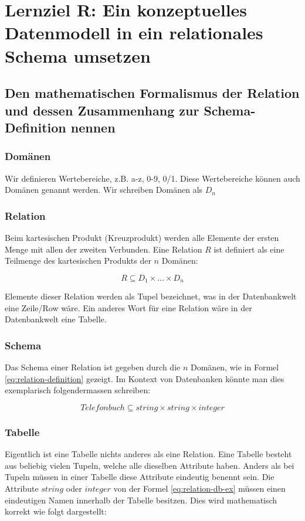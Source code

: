 \section{Lernziel R: Ein konzeptuelles Datenmodell in ein relationales Schema umsetzen}

\subsection{Den mathematischen Formalismus der Relation und dessen Zusammenhang zur Schema-Definition nennen}

\subsubsection{Domänen}
Wir definieren Wertebereiche, z.B. a-z, 0-9, 0/1. Diese Wertebereiche können auch Domänen genannt werden. Wir schreiben Domänen als $D_{n}$

\subsubsection{Relation}
Beim kartesischen Produkt (Kreuzprodukt) werden alle Elemente der ersten Menge mit allen der zweiten Verbunden. Eine Relation $R$ ist definiert als eine Teilmenge des kartesischen Produkts der $n$ Domänen:

\begin{equation}\label{eq:relation-definition}
    R \subseteq D_{1} \times \dots \times D_{n}
\end{equation}

Elemente dieser Relation werden als Tupel bezeichnet, was in der Datenbankwelt eine Zeile/Row wäre. Ein anderes Wort für eine Relation wäre in der Datenbankwelt eine Tabelle. 

\subsubsection{Schema}
Das Schema einer Relation ist gegeben durch die $n$ Domänen, wie in Formel \ref{eq:relation-definition} gezeigt. Im Kontext von Datenbanken könnte man dies exemplarisch folgendermassen schreiben:

\begin{equation}\label{eq:relation-db-ex}
    Telefonbuch \subseteq string \times string \times integer
\end{equation}

\subsubsection{Tabelle}
Eigentlich ist eine Tabelle nichts anderes als eine Relation. Eine Tabelle besteht aus beliebig vielen Tupeln, welche alle dieselben Attribute haben. Anders als bei Tupeln müssen in einer Tabelle diese Attribute eindeutig benennt sein.
Die Attribute $string$ oder $integer$ von der Formel \ref{eq:relation-db-ex} müssen einen eindeutigen Namen innerhalb der Tabelle besitzen. Dies wird mathematisch korrekt wie folgt dargestellt:

